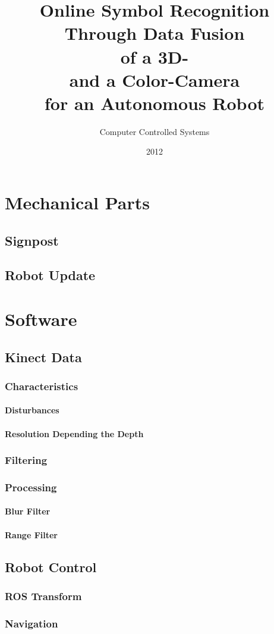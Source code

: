 \documentclass[oneside]{Ausarbeitung}
\title{Online Symbol Recognition \\ Through Data Fusion \\ of a 3D- \\ and a
Color-Camera \\ for an Autonomous Robot}
\subtitle{Computer Controlled Systems}
\date{2012}
\begin{document}
\maketitle 
 
 
 
\tableofcontents

\listoffigures

\listoftables 





\chapter{Mechanical Parts}
\section{Signpost}
\section{Robot Update}


\chapter{Software}
\section{Kinect Data}
\subsection{Characteristics}
\subsubsection{Disturbances}
\subsubsection{Resolution Depending the Depth}
\subsection{Filtering}
\subsection{Processing}
\subsubsection{Blur Filter}
\subsubsection{Range Filter}
\section{Robot Control}
\subsection{ROS Transform}
\subsection{Navigation}
\end{document}
